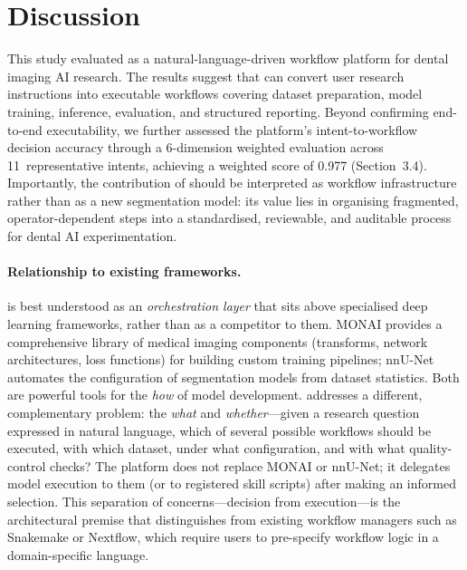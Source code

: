
\section{Discussion}

This study evaluated \dentalclaw{} as a natural-language-driven workflow platform
for dental imaging AI research. The results suggest that \dentalclaw{} can convert
user research instructions into executable workflows covering dataset preparation,
model training, inference, evaluation, and structured reporting. Beyond confirming
end-to-end executability, we further assessed the platform's intent-to-workflow
decision accuracy through a 6-dimension weighted evaluation across 11~representative
intents, achieving a weighted score of 0.977 (Section~3.4). Importantly, the
contribution of \dentalclaw{} should be interpreted as workflow infrastructure
rather than as a new segmentation model: its value lies in organising fragmented,
operator-dependent steps into a standardised, reviewable, and auditable process for
dental AI experimentation.

\paragraph{Relationship to existing frameworks.}
\dentalclaw{} is best understood as an \textit{orchestration layer} that sits above
specialised deep learning frameworks, rather than as a competitor to them. MONAI
provides a comprehensive library of medical imaging components (transforms, network
architectures, loss functions) for building custom training pipelines; nnU-Net
automates the configuration of segmentation models from dataset statistics. Both
are powerful tools for the \textit{how} of model development. \dentalclaw{} addresses
a different, complementary problem: the \textit{what} and \textit{whether}---given a
research question expressed in natural language, which of several possible workflows
should be executed, with which dataset, under what configuration, and with what
quality-control checks? The platform does not replace MONAI or nnU-Net; it delegates
model execution to them (or to registered skill scripts) after making an informed
selection. This separation of concerns---decision from execution---is the
architectural premise that distinguishes \dentalclaw{} from existing workflow
managers such as Snakemake or Nextflow, which require users to pre-specify workflow
logic in a domain-specific language.

